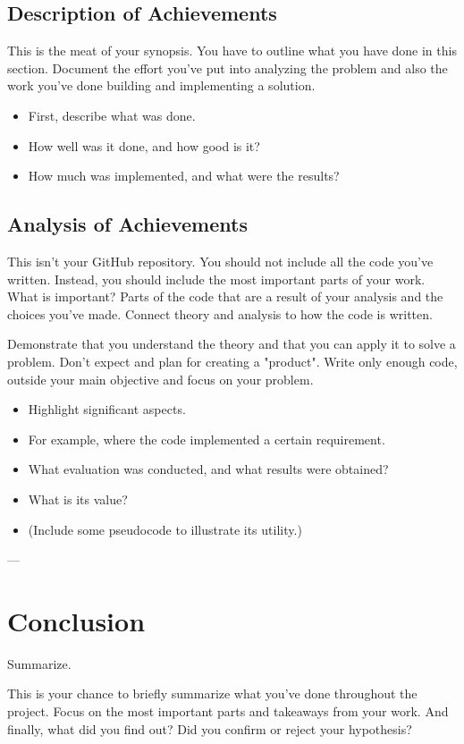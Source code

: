\documentclass{article}
\begin{document}
\subsection{Description of Achievements}

This is the meat of your synopsis.
You have to outline what you have done in this section.
Document the effort you've put into analyzing the problem and also the work you've done building and implementing a solution.
\begin{itemize}
    \item First, describe what was done.
    \item How well was it done, and how good is it?
    \item How much was implemented, and what were the results?
\end{itemize}

\subsection{Analysis of Achievements}

This isn't your GitHub repository. You should not include all the code you've written. Instead, you should include the most important parts of your work.
What is important? Parts of the code that are a result of your analysis and the choices you've made. Connect theory and analysis to how the code is written.

Demonstrate that you understand the theory and that you can apply it to solve a problem. Don't expect and plan for creating a "product". Write only enough code, outside your main objective and focus on your problem.
\begin{itemize}
    \item Highlight significant aspects.
    \item For example, where the code implemented a certain requirement.
    \item What evaluation was conducted, and what results were obtained?
    \item What is its value?
    \item (Include some pseudocode to illustrate its utility.)
\end{itemize}

---

\section{Conclusion}

Summarize.

This is your chance to briefly summarize what you've done throughout the project. Focus on the most important parts and takeaways from your work. And finally, what did you find out? Did you confirm or reject your hypothesis?
\end{document}
